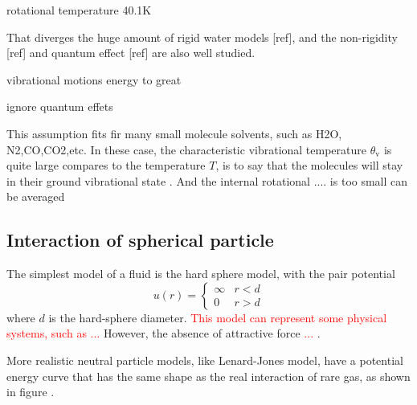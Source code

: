 rotational temperature 40.1K

That diverges the huge amount of rigid water models {[}ref{]}, and
the non-rigidity {[}ref{]} and quantum effect {[}ref{]} are also well
studied.

vibrational motions energy to great 

ignore quantum effets

This assumption fits fir many small molecule solvents, such as H2O,
N2,CO,CO2,etc. In these case, the characteristic vibrational temperature
$\theta_{\mathrm{v}}$ is quite large compares to the temperature
$T$, is to say that the molecules will stay in their ground vibrational
state \citep{Gray-Gubbins}. And the internal rotational .... is too
small can be averaged


\subsection{Interaction of spherical particle}

The simplest model of a fluid is the hard sphere model, with the pair
potential
\begin{equation}
u(r)=\begin{cases}
\infty & r<d\\
0 & r>d
\end{cases}
\end{equation}
where $d$ is the hard-sphere diameter. \textcolor{red}{This model
can represent some physical systems, such as ... }However, the absence
of attractive force \textcolor{red}{...} .

More realistic neutral particle models, like Lenard-Jones model, have
a potential energy curve that has the same shape as the real interaction
of rare gas, as shown in figure .

